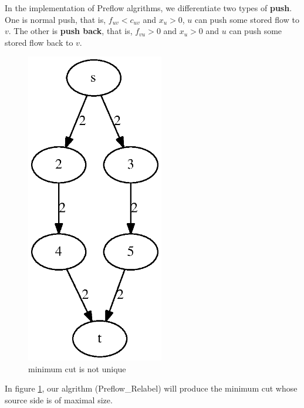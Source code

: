 \documentclass{article}
\begin{document}
In the implementation of Preflow algrithms, we differentiate
two types of \textbf{push}. One is normal push, that is,
$f_{uv} < c_{uv}$ and $x_u >0$, $u$ can push some stored flow
to $v$. The other is \textbf{push back}, that is,
$f_{vu} >0$ and $x_u >0$ and $u$ can push some stored flow back to $v$.

\begin{figure}[!ht]
\centering
\includegraphics[width=6cm]{fig/size.eps}
\caption{minimum cut is not unique}\label{fig:mc}
\end{figure}

In figure \ref{fig:mc}, our algrithm (Preflow\_Relabel) will produce the minimum cut whose source side is of maximal size.
\end{document}
